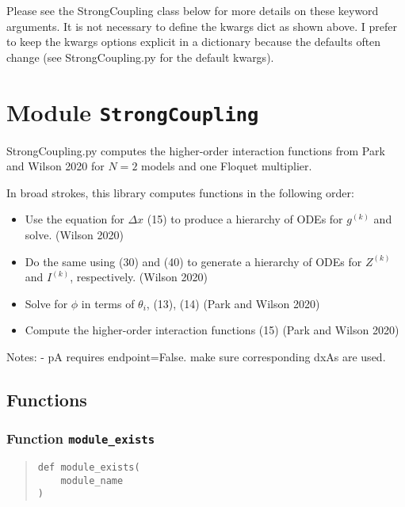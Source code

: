 \documentclass[
  english,
  a4paper,
  oneside]{article}
\providecommand{\tightlist}{%
  \setlength{\itemsep}{0pt}\setlength{\parskip}{0pt}}
\begin{document}
Please see the StrongCoupling class below for more details on these
keyword arguments. It is not necessary to define the kwargs dict as
shown above. I prefer to keep the kwargs options explicit in a
dictionary because the defaults often change (see StrongCoupling.py for
the default kwargs).

\hypertarget{StrongCoupling}{%
\section{\texorpdfstring{Module
\texttt{StrongCoupling}}{Module StrongCoupling}}\label{StrongCoupling}}

StrongCoupling.py computes the higher-order interaction functions from
Park and Wilson 2020 for \(N=2\) models and one Floquet multiplier.

In broad strokes, this library computes functions in the following
order:

\begin{itemize}
\tightlist
\item
  Use the equation for \(\Delta x\) (15) to produce a hierarchy of ODEs
  for \(g^{(k)}\) and solve. (Wilson 2020)
\item
  Do the same using (30) and (40) to generate a hierarchy of ODEs for
  \(Z^{(k)}\) and \(I^{(k)}\), respectively. (Wilson 2020)
\item
  Solve for \(\phi\) in terms of \(\theta_i\), (13), (14) (Park and
  Wilson 2020)
\item
  Compute the higher-order interaction functions (15) (Park and Wilson
  2020)
\end{itemize}

Notes: - pA requires endpoint=False. make sure corresponding dxAs are
used.

\hypertarget{functions}{%
\subsection{Functions}\label{functions}}

\hypertarget{StrongCoupling.module_exists}{%
\subsubsection{\texorpdfstring{Function
\texttt{module\_exists}}{Function module\_exists}}\label{StrongCoupling.module_exists}}

\begin{quote}
\begin{verbatim}
def module_exists(
    module_name
)
\end{verbatim}
\end{quote}
\end{document}

